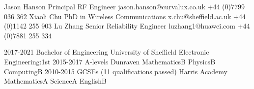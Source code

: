 \documentclass[9pt]{developercv} %
\begin{document}
	\begin{minipage}[t]{0.40\textwidth}%

		\halfentry
			{Jason Hanson}
			{Principal RF Engineer}
			{
				\hspace*{0.5cm}jason.hanson@curvalux.co.uk\newline
				\hspace*{0.5cm}+44 (0)7799 036 362\newline
			}
		\halfentry
			{Xiaoli Chu}
			{PhD in Wireless Communications}
			{
				\hspace*{0.5cm}x.chu@sheffield.ac.uk\newline
				\hspace*{0.5cm}+44 (0)1142 255 903\newline\newline
			}
		\halfentry
			{Lu Zhang}
			{Senior Reliability Engineer}
			{	
				\hspace*{0.5cm}luzhang1@huawei.com\newline
				\hspace*{0.5cm}+44 (0)7881 255 334\newline
			}

		
	\end{minipage}
	\hspace*{0.5cm}
	\begin{minipage}[t]{0.57\textwidth}

		\halfentrydate
			{2017-2021}
			{Bachelor of Engineering}
			{University of Sheffield}
			{
				\hspace*{0.5cm}Electronic Engineering:\hfill1st\newline\newline
			}
		\halfentrydate
			{2015-2017}
			{A-levels}
			{Dunraven}
			{
				\hspace*{0.5cm}Mathematics\hfill B\newline
				\hspace*{0.5cm}Physics\hfill B\newline
				\hspace*{0.5cm}Computing\hfill B\newline
			}
		\halfentrydate
			{2010-2015}
			{GCSEs (11 qualifications passed)}
			{Harris Academy}
			{
				\hspace*{0.5cm}Mathematics\hfill A\newline
				\hspace*{0.5cm}Science\hfill A\newline
				\hspace*{0.5cm}English\hfill B\newline
			}
	\end{minipage}%

	
\end{document}
